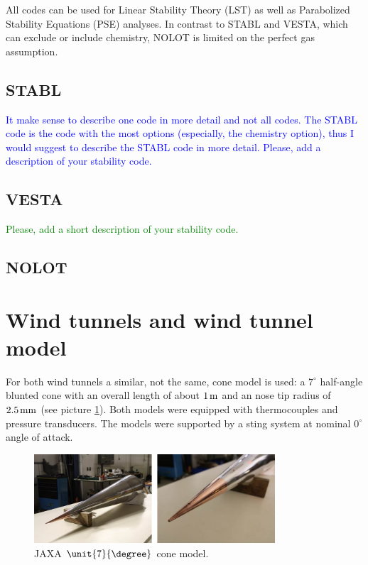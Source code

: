 \documentclass[]{aiaa-tc}%
\begin{document}
All codes can be used for Linear Stability Theory (LST) as well as Parabolized Stability Equations (PSE) analyses. In contrast to STABL and VESTA, which can exclude or include chemistry, NOLOT is limited on the perfect gas assumption.  

\subsection{STABL}
\textcolor{blue}{It make sense to describe one code in more detail and not all codes. The STABL code is the code with the most options (especially, the chemistry option), thus I would suggest to describe the STABL code in more detail. Please, add a description of your stability code.}
\subsection{VESTA}
\textcolor{green}{Please, add a short description of your stability code.}
\subsection{NOLOT}

\section{Wind tunnels and wind tunnel model}\label{sect:model}
For both wind tunnels a similar, not the same, cone model is used: a $7^\circ$ half-angle blunted cone with an overall length of about $1 \hspace{0.05cm} \rm m$ and an nose tip radius of $2.5\hspace{0.05cm} \rm mm$ (see picture \ref{fig:cone_model}). Both models were equipped with thermocouples and pressure transducers. The models were supported by a sting system at nominal $0^\circ$ angle of attack.\\

\begin{figure}[htbp]
	\centering
\includegraphics[width=0.8\textwidth]{pics/2018_cone_model.jpg}
	\caption{JAXA $\unit{7}{\degree}$ cone model.}
	\label{fig:cone_model}
\end{figure}
\end{document}
